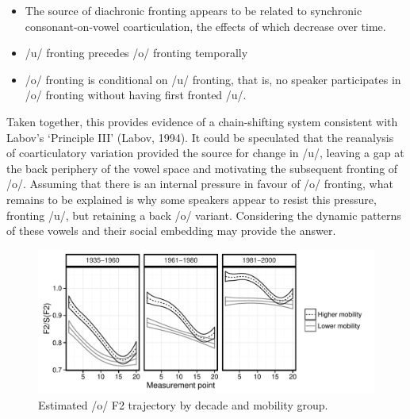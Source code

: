 \documentclass[12pt]{article}
\begin{document}
\begin{itemize}
\item{The source of diachronic fronting appears to be related to synchronic consonant-on-vowel coarticulation, the effects of which decrease over time.}
\item{/u/ fronting precedes /o/ fronting temporally}
\item{/o/ fronting is conditional on /u/ fronting, that is, no speaker participates in /o/ fronting without having first fronted /u/.}
\end{itemize}

Taken together, this provides evidence of a chain-shifting system consistent with Labov's `Principle III' (Labov, 1994). It could be speculated that the reanalysis of coarticulatory variation provided the source for change in /u/, leaving a gap at the back periphery of the vowel space and motivating the subsequent fronting of /o/. Assuming that there is an internal pressure in favour of /o/ fronting, what remains to be explained is why some speakers appear to resist this pressure, fronting /u/, but retaining a back /o/ variant. Considering the dynamic patterns of these vowels and their social embedding may provide the answer.

\begin{figure}
\centering
\includegraphics[scale=0.9]{owdynamicsclass.pdf}
\caption{Estimated /o/ F2 trajectory by decade and mobility group.}
\end{figure}
\end{document}
